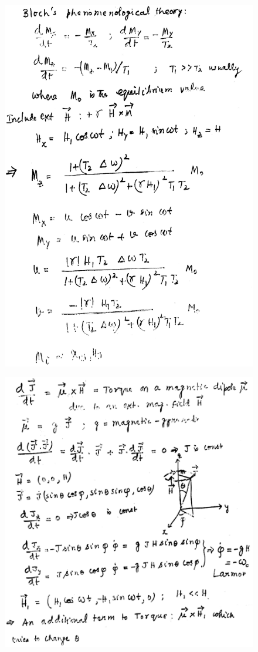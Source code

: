 \begin{figure}[H]
\centering
\includegraphics[scale=0.48]{src/images/chap8/2.eps}
\end{figure}
\begin{figure}[H]
\centering
\includegraphics[scale=0.485]{src/images/chap8/3.eps}
\end{figure}
